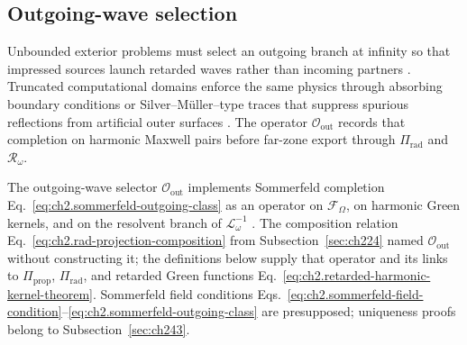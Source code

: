 \subsection{Outgoing-wave selection}
\label{sec:ch242}
Unbounded exterior problems must select an outgoing branch at infinity so that impressed sources
launch retarded waves rather than incoming partners \cite{sommerfeld1949,stratton1941}.
Truncated computational domains enforce the same physics through absorbing boundary conditions or
Silver--M\"uller--type traces that suppress spurious reflections from artificial outer surfaces
\cite{stratton1941,harrington2001}. The operator $\mathcal{O}_{\mathrm{out}}$ records that
completion on harmonic Maxwell pairs before far-zone export through $\Pi_{\mathrm{rad}}$ and
$\mathcal{R}_\omega$.

The outgoing-wave selector $\mathcal{O}_{\mathrm{out}}$ implements Sommerfeld completion
Eq.~\eqref{eq:ch2.sommerfeld-outgoing-class} as an operator on $\mathcal{F}_\Omega$, on
harmonic Green kernels, and on the resolvent branch of $\mathcal{L}_\omega^{-1}$
\cite{stratton1941}. The composition relation
Eq.~\eqref{eq:ch2.rad-projection-composition} from Subsection~\ref{sec:ch224} named
$\mathcal{O}_{\mathrm{out}}$ without constructing it; the definitions below supply that
operator and its links to $\Pi_{\mathrm{prop}}$, $\Pi_{\mathrm{rad}}$, and retarded
Green functions Eq.~\eqref{eq:ch2.retarded-harmonic-kernel-theorem}. Sommerfeld field
conditions
Eqs.~\eqref{eq:ch2.sommerfeld-field-condition}--\eqref{eq:ch2.sommerfeld-outgoing-class}
are presupposed; uniqueness proofs belong to Subsection~\ref{sec:ch243}.

